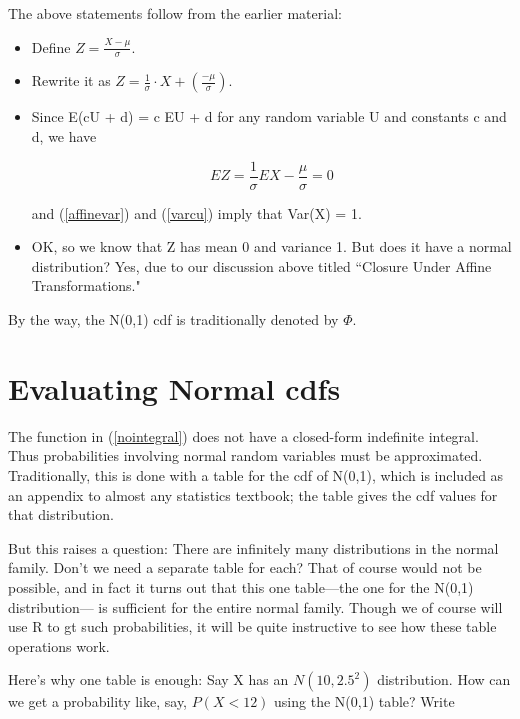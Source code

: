 The above statements follow from the earlier material:

\begin{itemize}

\item Define $Z = \frac{X - \mu}{\sigma}$.

\item Rewrite it as $Z = \frac{1}{\sigma} \cdot X +
(\frac{-\mu}{\sigma})$.

\item Since E(cU + d) = c EU + d for any random variable U and constants
c and d, we have

\begin{equation}
EZ = \frac{1}{\sigma} EX - \frac{\mu}{\sigma} = 0
\end{equation}

and (\ref{affinevar}) and (\ref{varcu}) imply that Var(X) = 1.

\item OK, so we know that Z has mean 0 and variance 1.  But does it have
a normal distribution?  Yes, due to our discussion above titled
``Closure Under Affine Transformations."

\end{itemize}

By the way, the N(0,1) cdf is traditionally denoted by $\Phi$.  

\section{Evaluating Normal cdfs}

The function in (\ref{nointegral}) does not have a closed-form
indefinite integral.  Thus probabilities involving normal random
variables must be approximated.  Traditionally, this is done with a
table for the cdf of N(0,1), which is included as an appendix to almost
any statistics textbook; the table gives the cdf values for that
distribution.

But this raises a question:  There are infinitely many distributions in
the normal family.  Don't we need a separate table for each?  That of
course would not be possible, and in fact it turns out that this one
table---the one for the N(0,1) distribution--- is sufficient for the
entire normal family.  Though we of course will use R to gt such
probabilities, it will be quite instructive to see how these table
operations work.

Here's why one table is enough: Say X has an $N(10,2.5^2)$ distribution.
How can we get a probability like, say, $P(X < 12)$ using the N(0,1)
table?  Write

